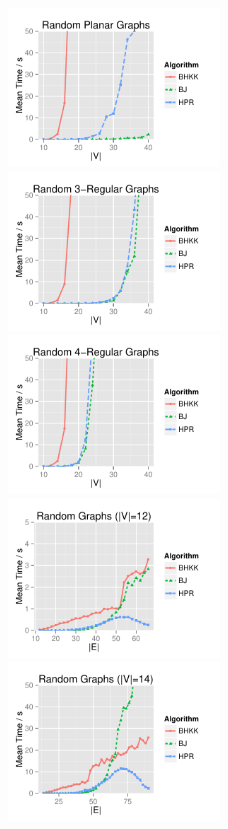 \begin{figure}[!p]
\centering
\includegraphics[width=0.5\textwidth]{data/Exp1_planar_graphs.pdf}%
\includegraphics[width=0.5\textwidth]{data/Exp1_reg3_graphs.pdf}
\includegraphics[width=0.5\textwidth]{data/Exp1_reg4_graphs.pdf}%
\includegraphics[width=0.5\textwidth]{data/Exp1_random12_graphs.pdf}
\includegraphics[width=0.5\textwidth]{data/Exp1_random14_graphs.pdf}%

\end{figure}
